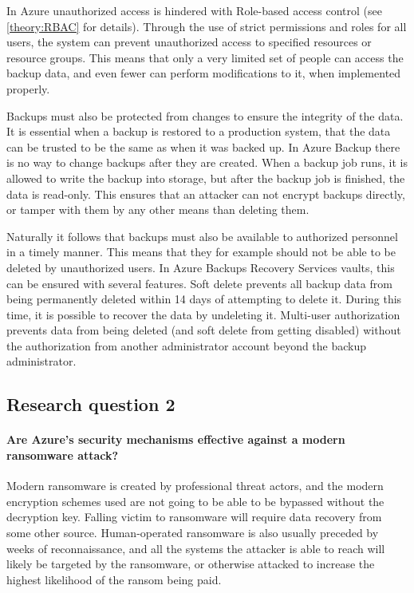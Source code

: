 In Azure unauthorized access is hindered with Role-based access control (see \ref{theory:RBAC} for details). Through the use of strict permissions and roles for all users, the system can prevent unauthorized access to specified resources or resource groups. This means that only a very limited set of people can access the backup data, and even fewer can perform modifications to it, when implemented properly. 

Backups must also be protected from changes to ensure the integrity of the data. It is essential when a backup is restored to a production system, that the data can be trusted to be the same as when it was backed up. In Azure Backup there is no way to change backups after they are created. When a backup job runs, it is allowed to write the backup into storage, but after the backup job is finished, the data is read-only. This ensures that an attacker can not encrypt backups directly, or tamper with them by any other means than deleting them. 

Naturally it follows that backups must also be available to authorized personnel in a timely manner. This means that they for example should not be able to be deleted by unauthorized users. In Azure Backups Recovery Services vaults, this can be ensured with several features. 
Soft delete prevents all backup data from being permanently deleted within 14 days of attempting to delete it.
During this time, it is possible to recover the data by undeleting it.
Multi-user authorization prevents data from being deleted (and soft delete from getting disabled) without the authorization from another administrator account beyond the backup administrator.

\subsection{Research question 2}
\paragraph{Are Azure's security mechanisms effective against a modern ransomware attack?}

Modern ransomware is created by professional threat actors, and the modern encryption schemes used are not going to be able to be bypassed without the decryption key. Falling victim to ransomware will require data recovery from some other source. Human-operated ransomware is also usually preceded by weeks of reconnaissance, and all the systems the attacker is able to reach will likely be targeted by the ransomware, or otherwise attacked to increase the highest likelihood of the ransom being paid.

